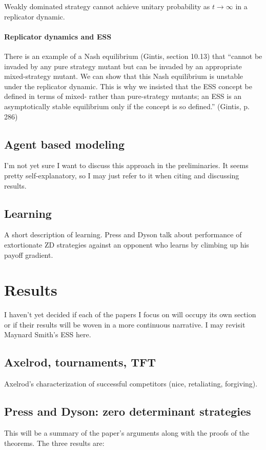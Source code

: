 \begin{theorem}
Weakly dominated strategy cannot achieve unitary probability as $t \rightarrow \infty$ in a replicator dynamic.
\end{theorem}

\subsubsection{Replicator dynamics and ESS}
There is an example of a Nash equilibrium (Gintis, section 10.13) that ``cannot be invaded by any pure strategy mutant but can be invaded by an appropriate mixed-strategy mutant. We can show that this Nash equilibrium is unstable under the replicator dynamic. This is why we insisted that the ESS concept be defined in terms of mixed- rather than pure-strategy mutants; an ESS is an asymptotically stable equilibrium only if the concept is so defined.'' (Gintis, p. 286)

\section{Agent based modeling}
I'm not yet sure I want to discuss this approach in the preliminaries. It seems pretty self-explanatory, so I may just refer to it when citing and discussing results.

\section{Learning}
A short description of learning. Press and Dyson talk about performance of extortionate ZD strategies against an opponent who learns by climbing up his payoff gradient.

\chapter{Results}
I haven't yet decided if each of the papers I focus on will occupy its own section or if their results will be woven in a more continuous narrative. I may revisit Maynard Smith's ESS here.

\section{Axelrod, tournaments, TFT}
Axelrod's characterization of successful competitors (nice, retaliating, forgiving).

\section{Press and Dyson: zero determinant strategies}
This will be a summary of the paper's arguments along with the proofs of the theorems. The three results are:

